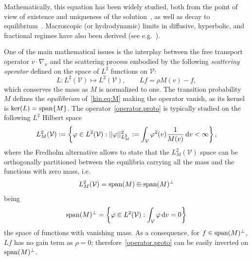 \documentclass[a4paper]{article}
\theoremstyle{Theorem}\newtheorem{proposition}{Proposition}[section]
\theoremstyle{Remark}\newtheorem{remark}{Remark}[section]
\theoremstyle{Theorem}\newtheorem{theorem}{Theorem}[section]
\newcommand{\intV}{\int_{\mathcal{V}}}
\begin{document}
Mathematically, this equation has been widely studied, both from the point of view of existence and uniqueness of the solution~\cite{pettersson1983existence}, as well as decay to equilibrium~\cite{pettersson1992convergence,pettersson1993weak,Bisi2014EntropyDE,canizo2020KRM,desvillettes2006}. Macroscopic (or hydrodynamic) limits in diffusive, hyperbolic, and fractional regimes have also been derived (see e.g.~\cite{hillen2000SIAP,hillen2006JMB,degond2000IUMJ,mellet2008ARMA}). 

One of the main mathematical issues is the interplay between the free transport operator $v\cdot \nabla_x$ and the scattering process embodied by the following \textit{scattering operator} defined on the space of $L^2$ functions on $\mathcal{V}$:
\begin{equation}\label{operator.proto}
L: L^2(\mathcal{V}) \longmapsto L^2(\mathcal{V}), \qquad Lf=\rho M(v) -f,
\end{equation}
which conserves the mass as $M$ is normalized to one. The transition probability $M$ defines the \textit{equilibrium} of~\eqref{kin.eq:M} making the operator vanish, as its kernel is $\ker(L) = {\rm span} \lbrace M\rbrace$. The operator~\eqref{operator.proto} is typically studied on the following $L^2$ Hilbert space
\begin{equation*}\label{Hilbert.proto}
L_M^2(\mathcal{V}):= \left\{ \varphi \in L^2(\mathcal{V}) : || \varphi||^2_{L^2_M}:= \intV \varphi^2(v) \dfrac{1}{M(v)} \, {\rm d} v <  \infty \right\},
\end{equation*}
where the Fredholm alternative allows to state that the $L_M^2(\mathcal{V})$ space can be orthogonally partitioned between the equilibria carrying all the mass and the functions with zero mass, i.e.
\begin{equation}\label{L2M}
 L_M^2(\mathcal{V}) = {\rm span} (M) \oplus   {\rm span} (M)^{\bot}
\end{equation}
being
\begin{equation}\label{spanM}
    {\rm span} (M)^{\bot} = \left\{ \varphi \in L^2(\mathcal{V}) : \intV \varphi \, {\rm d} v = 0 \right\}
\end{equation}
the space of functions with vanishing mass.
As a consequence,  for $f \in {\rm span} (M)^{\bot}$,  $Lf$ has no gain term as $\rho=0$; therefore~\eqref{operator.proto} can be easily inverted on $ {\rm span} (M)^{\bot}$.
\end{document}
